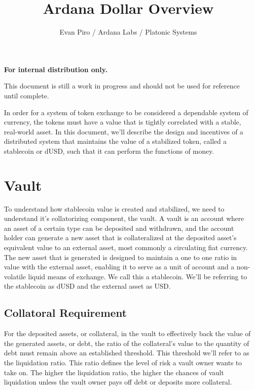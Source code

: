 \documentclass[12pt]{article}
\title{Ardana Dollar Overview}
\author{Evan Piro / Ardana Labs / Platonic Systems}
\begin{document}
\maketitle

\begin{center}
	\textbf{For internal distribution only.}
\end{center}

\begin{center}
	\color{red} This document is still a work in progress and should not be used for reference until complete.
\end{center}

In order for a system of token exchange to be considered a dependable system of currency, the tokens must have a value that is tightly correlated with a stable, real-world asset. In this document, we'll describe the design and incentives of a distributed system that maintains the value of a stabilized token, called a stablecoin or dUSD, such that it can perform the functions of money.

\section{Vault}

To understand how stablecoin value is created and stabilized, we need to understand it's collatorizing component, the vault. A vault is an account where an asset of a certain type can be deposited and withdrawn, and the account holder can generate a new asset that is collateralized at the deposited asset's equivalent value to an external asset, most commonly a circulating fiat currency. The new asset that is generated is designed to maintain a one to one ratio in value with the external asset, enabling it to serve as a unit of account and a non-volatile liquid means of exchange. We call this a stablecoin. We'll be referring to the stablecoin as dUSD and the external asset as USD.

\subsection{Collatoral Requirement}

For the deposited assets, or collateral, in the vault to effectively back the value of the generated assets, or debt, the ratio of the collateral's value to the quantity of debt must remain above an established threshold. This threshold we'll refer to as the liquidation ratio. This ratio defines the level of risk a vault owner wants to take on. The higher the liquidation ratio, the higher the chances of vault liquidation unless the vault owner pays off debt or deposits more collateral.
\end{document}
